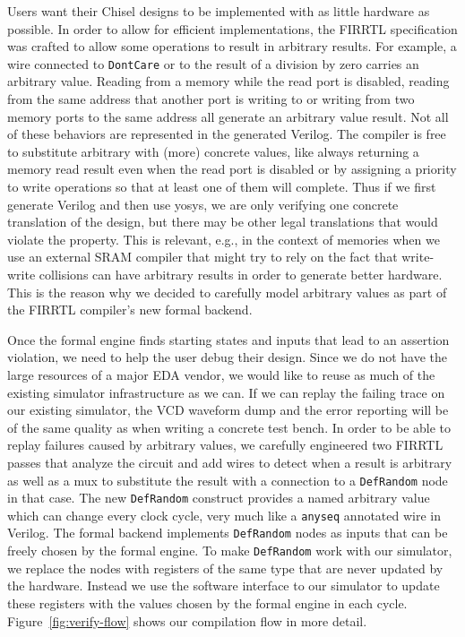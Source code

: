 \documentclass[conference]{IEEEtran}
\newcommand{\code}[1]{{\small{\texttt{#1}}}}
\begin{document}
Users want their Chisel designs to be implemented with as little hardware as possible.
In order to allow for efficient implementations, the FIRRTL specification was crafted to allow
some operations to result in arbitrary results.
For example, a wire connected to \code{DontCare} or to the result of a division by zero carries an arbitrary value.
Reading from a memory while the read port is disabled, reading from the same address that another port is writing to or
writing from two memory ports to the same address all generate an arbitrary value result.
Not all of these behaviors are represented in the generated Verilog.
The compiler is free to substitute arbitrary with (more) concrete values, like always returning a memory read result even
when the read port is disabled or by assigning a priority to write operations so that at least one of them will complete.
Thus if we first generate Verilog and then use yosys, we are only verifying one concrete translation of the design,
but there may be other legal translations that would violate the property.
This is relevant, e.g., in the context of memories when we use an external SRAM compiler that might try to
rely on the fact that write-write collisions can have arbitrary results in order to generate better hardware.
This is the reason why we decided to carefully model arbitrary values as part of the FIRRTL compiler's new formal backend.

Once the formal engine finds starting states and inputs that lead to an assertion violation, we need to help the user debug their design.
Since we do not have the large resources of a major EDA vendor, we would like to reuse as much of the existing simulator infrastructure as we can.
If we can replay the failing trace on our existing simulator, the VCD waveform dump and the error reporting will be of the same quality as
when writing a concrete test bench.
In order to be able to replay failures caused by arbitrary values, we carefully engineered two FIRRTL passes that analyze the circuit and
add wires to detect when a result is arbitrary as well as a mux to substitute the result with a connection to a \code{DefRandom} node in that case.
The new \code{DefRandom} construct provides a named arbitrary value which can change every clock cycle,
very much like a \code{anyseq} annotated wire in Verilog.
The formal backend implements \code{DefRandom} nodes as inputs that can be freely chosen by the formal engine.
To make \code{DefRandom} work with our simulator, we  replace the nodes with registers of the same type that are never updated by the hardware.
Instead we use the software interface to our simulator to update these registers with the values chosen by the formal engine in each cycle.
Figure~\ref{fig:verify-flow} shows our compilation flow in more detail.
\end{document}
